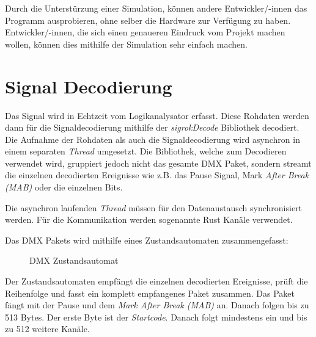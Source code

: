 Durch die Unterstürzung einer Simulation, können andere Entwickler/-innen das Programm ausprobieren, ohne selber die Hardware zur Verfügung zu haben. Entwickler/-innen, die sich einen genaueren Eindruck vom Projekt machen wollen, können dies mithilfe der Simulation sehr einfach machen.


\section{Signal Decodierung}


Das Signal wird in Echtzeit vom Logikanalysator erfasst. Diese Rohdaten werden dann für die Signaldecodierung mithilfe der \emph{sigrokDecode} \cite{githubLibsigrokDecode} Bibliothek decodiert. Die Aufnahme der Rohdaten als auch die Signaldecodierung wird asynchron in einem separaten \emph{Thread} umgesetzt. Die Bibliothek, welche zum Decodieren verwendet wird, gruppiert jedoch nicht das gesamte DMX Paket, sondern streamt die einzelnen decodierten Ereignisse wie z.B. das Pause Signal, Mark \emph{After Break (MAB)} oder die einzelnen Bits.

Die asynchron laufenden \emph{Thread} müssen für den Datenaustausch synchronisiert werden. Für die Kommunikation werden sogenannte Rust Kanäle verwendet.

Das DMX Pakets wird mithilfe eines Zustandsautomaten zusammengefasst:

\begin{figure}[H]
	\centering
	\caption{DMX Zustandsautomat}
	\label{fig:my_label}
\end{figure}

Der Zustandsautomaten empfängt die einzelnen decodierten Ereignisse, prüft die Reihenfolge und fasst ein komplett empfangenes Paket zusammen. Das Paket fängt mit der Pause und dem \emph{Mark After Break (MAB)} an. Danach folgen bis zu 513 Bytes. Der erste Byte ist der \emph{Startcode}. Danach folgt mindestens ein und bis zu 512 weitere Kanäle.

